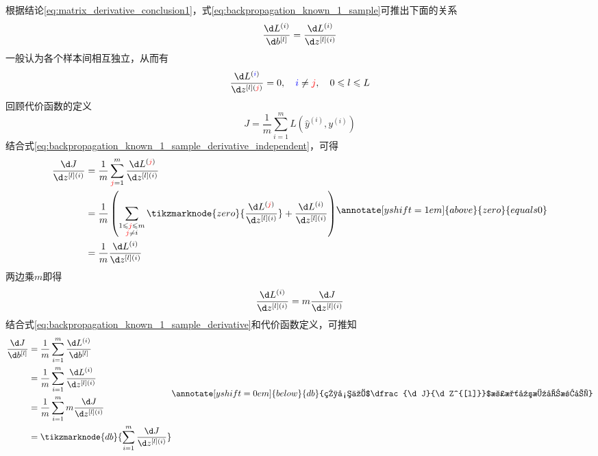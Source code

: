 根据结论\eqref{eq:matrix_derivative_conclusion1}，式\eqref{eq:backpropagation_known_1_sample}可推出下面的关系
\begin{equation}
    \frac{\d L^{(i)}}{\d b^{[l]}} = \frac{\d L^{(i)}}{\d z^{[l](i)}}
    \label{eq:backpropagation_known_1_sample_derivative}
\end{equation}
一般认为各个样本间相互独立，从而有
\begin{equation}
    \frac{\d L^{(\textcolor{blue}{i})}}{\d z^{[l](\textcolor{red}{j})}}=0
    , \quad \textcolor{blue}{i} \neq \textcolor{red}{j}, \quad 0 \leqslant l \leqslant L
    \label{eq:backpropagation_known_1_sample_derivative_independent}
\end{equation}
回顾代价函数的定义
\begin{equation}
    J = \frac{1}{m} \sum_{i=1}^{m} L(\hat{y}^{(i)}, y^{(i)})
\end{equation}
结合式\eqref{eq:backpropagation_known_1_sample_derivative_independent}，可得
\begin{equation}
    \begin{aligned}
        \frac{\d J}{\d z^{[l](i)}} 
        &= \frac{1}{m}  \sum_{\textcolor{red}{j}=1}^{m} \frac{\d L^{(\textcolor{red}{j})}}{\d z^{[l](i)}} \\
        &= \frac{1}{m}  \left( \sum_{\substack{1 \leqslant \textcolor{red}{j} \leqslant m \\ \textcolor{red}{j} \neq i}} \tikzmarknode{zero}{\frac{\d L^{(\textcolor{red}{j})}}{\d z^{[l](i)}}} + \frac{\d L^{(i)}}{\d z^{[l](i)}} \right) \\
        &= \frac{1}{m} \frac{\d L^{(i)}}{\d z^{[l](i)}} \\
    \end{aligned}
    \annotate[yshift=1em]{above}{zero}{equals 0}
\end{equation}
两边乘$m$即得
\begin{equation}
    \frac{\d L^{(i)}}{\d z^{[l](i)}} = m \frac{\d J}{\d z^{[l](i)}}
\end{equation}
结合式\eqref{eq:backpropagation_known_1_sample_derivative}和代价函数定义，可推知
\begin{equation}
    \begin{aligned}
        \frac{\d J}{\d b^{[l]}} 
        &= \frac{1}{m} \sum_{i=1}^{m} \frac{\d L^{(i)}}{\d b^{[l]}} \\
        &= \frac{1}{m} \sum_{i=1}^{m} \frac{\d L^{(i)}}{\d z^{[l](i)}} \\
        &= \frac{1}{m} \sum_{i=1}^{m} m \frac{\d J}{\d z^{[l](i)}} \\
        &= \tikzmarknode{db}{\sum_{i=1}^{m} \frac{\d J}{\d z^{[l](i)}}}
    \label{eq:backpropagation_conc_4}
    \end{aligned}
    \vspace{2em}
    \renewcommand{\eqnannotationstrut}{\rule[-0.7\baselineskip]{0pt}{1.5\baselineskip}}
    \annotate[yshift=0em]{below}{db}{相当于$\dfrac{\d J}{\d Z^{[l]}}$沿水平方向求和}
    \renewcommand{\eqnannotationstrut}{\strut} %
\end{equation}

